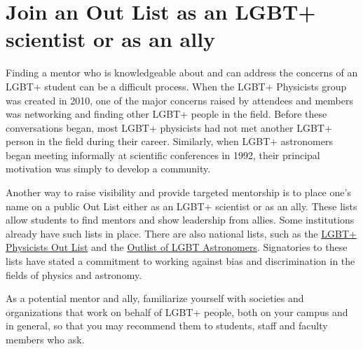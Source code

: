 \section {Join an Out List as an LGBT+ scientist or as an ally}
\label{outlist}
Finding a mentor who is knowledgeable about and can address the concerns of an LGBT+ student can be a difficult process. When the LGBT+ Physicists group was created in 2010, one of the major concerns raised by attendees and members was networking and finding other LGBT+ people in the field. Before these conversations began, most LGBT+ physicists had not met another LGBT+ person in the field during their career.  Similarly, when LGBT+ astronomers began meeting informally at scientific conferences in 1992, their principal motivation was simply to develop a community.

Another way to raise visibility and provide targeted mentorship is to place one's name on a public Out List either as an LGBT+ scientist or as an ally. These lists allow students to find mentors and show leadership from allies. Some institutions already have such lists in place. There are also national lists, such as the \href{http://lgbtphysicists.org/outlist.html}{LGBT+ Physicists Out List} and the \href{http://web.physics.ucsb.edu/~blaes/lgbtastro/}{Outlist of LGBT Astronomers}. Signatories to these lists have stated a commitment to working against bias and discrimination in the fields of physics and astronomy.

As a potential mentor and ally, familiarize yourself with societies and organizations that work on behalf of LGBT+ people, both on your campus and in general, so that you may recommend them to students, staff and faculty members who ask.

